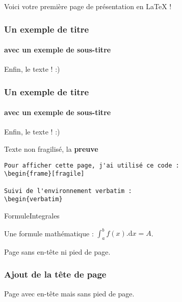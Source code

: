 \documentclass[t]{beamer}
\begin{document}
	\begin{frame}
	Voici votre première page de présentation en LaTeX !
	\end{frame}
	
	\begin{frame}[fragile]
	\frametitle{Un exemple de titre}
	\framesubtitle{avec un exemple de sous-titre}
	Enfin, le texte ! :)\\
	\lipsum[8]
	\end{frame}
	
	\begin{frame}[label=pagebanale]
	\frametitle{Un exemple de titre}
	\framesubtitle{avec un exemple de sous-titre}
	Enfin, le texte ! :)
	\end{frame}

\begin{frame}[fragile]

\begin{center}
Texte non fragilisé, la \textbf{preuve}
\end{center}

\begin{verbatim}
Pour afficher cette page, j'ai utilisé ce code :
\begin{frame}[fragile] 

Suivi de l'environnement verbatim :
\begin{verbatim}
\end{verbatim}

\end{frame}

\begin{frame}
{Formule}{Integrales}
\begin{semiverbatim}
Une formule mathématique : $\int_a^b{f(x).\text{d}x} = A$.
\end{semiverbatim}

\end{frame}
\begin{frame}[plain]
Page sans en-tête ni pied de page.
\end{frame}

\begin{frame}[plain]
\frametitle{Ajout de la tête de page}

Page avec en-tête mais sans pied de page.
\end{frame}
\end{document}
